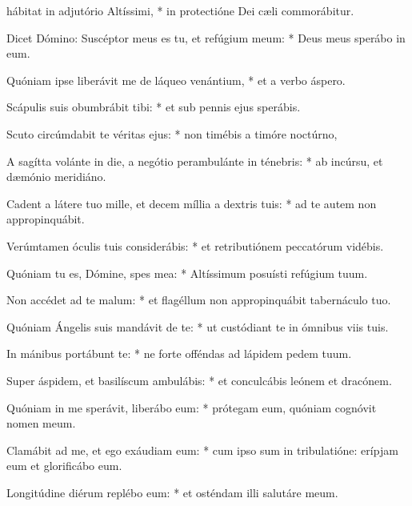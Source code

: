 \begin{psalmus}

 hábitat in adjutório Altíssimi, * in protectióne Dei cæli commorábitur.

Dicet Dómino: Suscéptor meus es tu, et refúgium meum: * Deus meus sperábo in eum.

Quóniam ipse liberávit me de láqueo venántium, * et a verbo áspero.

Scápulis suis obumbrábit tibi: * et sub pennis ejus sperábis.

Scuto circúmdabit te véritas ejus: * non timébis a timóre noctúrno,

A sagítta volánte in die, a negótio perambulánte in ténebris: * ab incúrsu, et dæmónio meridiáno.

Cadent a látere tuo mille, et decem míllia a dextris tuis: * ad te autem non appropinquábit.

Verúmtamen óculis tuis considerábis: * et retributiónem peccatórum vidébis.

Quóniam tu es, Dómine, spes mea: * Altíssimum posuísti refúgium tuum.

Non accédet ad te malum: * et flagéllum non appropinquábit tabernáculo tuo.

Quóniam Ángelis suis mandávit de te: * ut custódiant te in ómnibus viis tuis.

In mánibus portábunt te: * ne forte offéndas ad lápidem pedem tuum.

Super áspidem, et basilíscum ambulábis: * et conculcábis leónem et dracónem.

Quóniam in me sperávit, liberábo  eum: * prótegam eum, quóniam cognóvit nomen meum.

Clamábit ad me, et ego exáudiam eum: * cum ipso sum in tribulatióne: erípjam eum et glorificábo eum.

Longitúdine diérum replébo eum: * et osténdam illi salutáre meum.

\end{psalmus}
